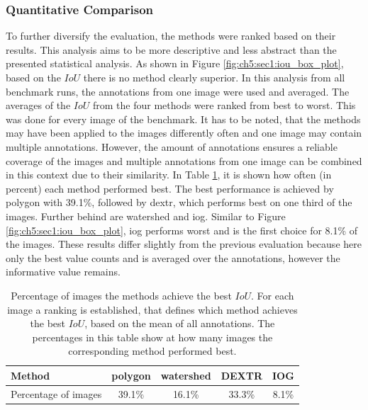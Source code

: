 \subsubsection{Quantitative Comparison}

To further diversify the evaluation, the methods were ranked based on their results.
This analysis aims to be more descriptive and less abstract than the presented statistical analysis.
As shown in Figure \ref{fig:ch5:sec1:iou_box_plot}, based on the $ IoU $ there is no method clearly superior.
In this analysis from all benchmark runs, the annotations from one image were used and averaged.
The averages of the $ IoU $ from the four methods were ranked from best to worst.
This was done for every image of the benchmark.
It has to be noted, that the methods may have been applied to the images differently often and one image may contain multiple annotations.
However, the amount of \getNumberBenchmarkAnnotations annotations ensures a reliable coverage of the images and multiple annotations from one image can be combined in this context due to their similarity.
In Table \ref{tab:ch5:best_performance_iou}, it is shown how often (in percent) each method performed best.
The best performance is achieved by polygon with 39.1\%, followed by \gls{dextr}, which performs best on one third of the images.
Further behind are watershed and \gls{iog}.
Similar to Figure \ref{fig:ch5:sec1:iou_box_plot}, \gls{iog} performs worst and is the first choice for 8.1\% of the images.
These results differ slightly from the previous evaluation because here only the best value counts and is averaged over the annotations, however the informative value remains. 

\begin{table}[h!]
	\centering
	\begin{tabular}{l|c c c c}
		Method					& polygon 	& watershed & DEXTR 	& IOG  \\
		\hline
		Percentage of images 	& 39.1\%	& 16.1\% 	& 33.3\% 	& 8.1\% \\
	\end{tabular}
	\caption[Method's best performance on $ IoU $]{
		Percentage of images the methods achieve the best $ IoU $.
		For each image a ranking is established, that defines which method achieves the best $ IoU $, based on the mean of all annotations.
		The percentages in this table show at how many images the corresponding method performed best.
	} \label{tab:ch5:best_performance_iou}
\end{table}


